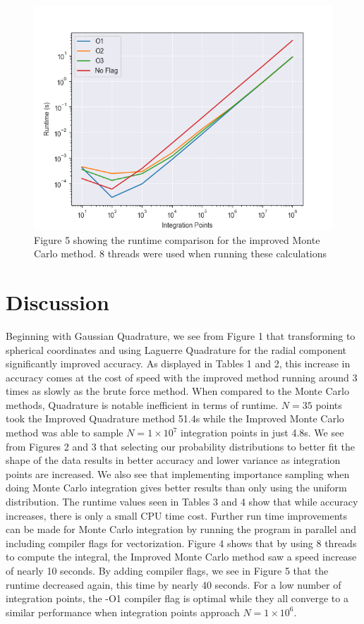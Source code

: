 \documentclass{emulateapj}
\begin{document}
\begin{figure}[H]
    \centering
    \includegraphics[scale=0.5]{flags.png}
    \caption{Figure 5 showing the runtime comparison for the improved Monte Carlo method. 8 threads were used when running these calculations}
    \label{fig:fig5}
\end{figure}

\section{Discussion}
\label{sec:discussion}
Beginning with Gaussian Quadrature, we see from Figure 1 that transforming to spherical coordinates and using Laguerre Quadrature for the radial component significantly improved accuracy. As displayed in Tables 1 and 2, this increase in accuracy comes at the cost of speed with the improved method running around 3 times as slowly as the brute force method. When compared to the Monte Carlo methods, Quadrature is notable inefficient in terms of runtime. $N=35$ points took the Improved Quadrature method 51.4s while the Improved Monte Carlo method was able to sample $N = 1\times10^{7}$ integration points in just 4.8s. We see from Figures 2 and 3 that selecting our probability distributions to better fit the shape of the data results in better accuracy and lower variance as integration points are increased. We also see that implementing importance sampling when doing Monte Carlo integration gives better results than only using the uniform distribution. The runtime values seen in Tables 3 and 4 show that while accuracy increases, there is only a small CPU time cost. Further run time improvements can be made for Monte Carlo integration by running the program in parallel and including compiler flags for vectorization. Figure 4 shows that by using 8 threads to compute the integral, the Improved Monte Carlo method saw a speed increase of nearly 10 seconds. By adding compiler flags, we see in Figure 5 that the runtime decreased again, this time by nearly 40 seconds. For a low number of integration points, the -O1 compiler flag is optimal while they all converge to a similar performance when integration points approach $N=1\times10^{6}.$
\end{document}
